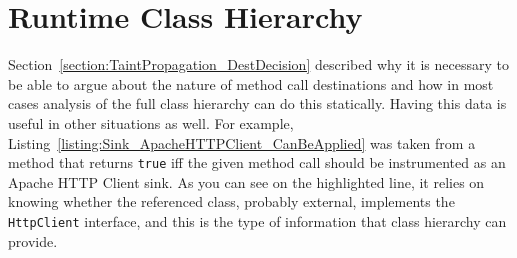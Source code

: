\documentclass[12pt,twoside,notitlepage]{report}
\begin{document}



\section{Runtime Class Hierarchy}

Section~\ref{section:TaintPropagation_DestDecision} described why it is necessary to be able to argue about the nature of method call destinations and how in most cases analysis of the full class hierarchy can do this statically. Having this data is useful in other situations as well. For example, Listing~\ref{listing:Sink_ApacheHTTPClient_CanBeApplied} was taken from a method that returns \verb$true$ iff the given method call should be instrumented as an Apache HTTP Client sink. As you can see on the highlighted line, it relies on knowing whether the referenced class, probably external, implements the \verb$HttpClient$ interface, and this is the type of information that class hierarchy can provide.
\end{document}
